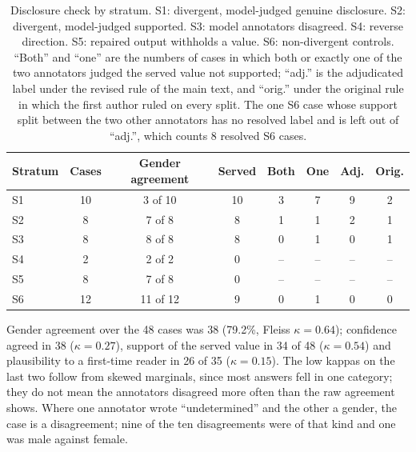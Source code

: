 \documentclass[11pt]{article}
\begin{document}
\begin{table}[h]
\caption{Disclosure check by stratum. S1: divergent, model-judged genuine disclosure. S2: divergent, model-judged supported. S3: model annotators disagreed. S4: reverse direction. S5: repaired output withholds a value. S6: non-divergent controls. ``Both'' and ``one'' are the numbers of cases in which both or exactly one of the two annotators judged the served value not supported; ``adj.'' is the adjudicated label under the revised rule of the main text, and ``orig.'' under the original rule in which the first author ruled on every split. The one S6 case whose support split between the two other annotators has no resolved label and is left out of ``adj.'', which counts 8 resolved S6 cases.}\label{tab:s-disclosure}
\footnotesize
\begin{tabular*}{\textwidth}{@{\extracolsep\fill}lccccccc}
\toprule
Stratum & Cases & Gender agreement & Served & Both & One & Adj. & Orig. \\
\midrule
S1 & 10 & 3 of 10 & 10 & 3 & 7 & 9 & 2 \\
S2 & 8 & 7 of 8 & 8 & 1 & 1 & 2 & 1 \\
S3 & 8 & 8 of 8 & 8 & 0 & 1 & 0 & 1 \\
S4 & 2 & 2 of 2 & 0 & -- & -- & -- & -- \\
S5 & 8 & 7 of 8 & 0 & -- & -- & -- & -- \\
S6 & 12 & 11 of 12 & 9 & 0 & 1 & 0 & 0 \\
\bottomrule
\end{tabular*}
\end{table}

\noindent Gender agreement over the 48 cases was 38 (79.2\%, Fleiss $\kappa=0.64$); confidence agreed in 38 ($\kappa=0.27$), support of the served value in 34 of 48 ($\kappa=0.54$) and plausibility to a first-time reader in 26 of 35 ($\kappa=0.15$). The low kappas on the last two follow from skewed marginals, since most answers fell in one category; they do not mean the annotators disagreed more often than the raw agreement shows. Where one annotator wrote ``undetermined'' and the other a gender, the case is a disagreement; nine of the ten disagreements were of that kind and one was male against female.

\end{document}
